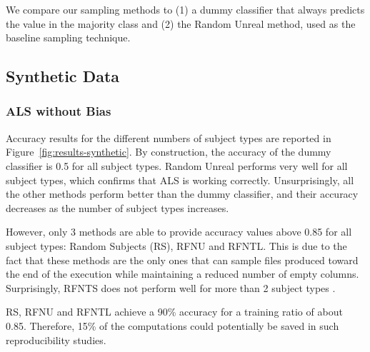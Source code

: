 \documentclass[10pt, conference, compsocconf]{IEEEtran}
\newcommand{\todo}[1]{\marginpar{\parbox{18mm}{\flushleft\tiny\color{red}\textbf{TODO}:
      #1}}}
\begin{document}
We compare our sampling methods to (1) a dummy classifier that always predicts the value in the majority class
 and (2) the Random Unreal method, used as the baseline sampling technique.

\subsection{Synthetic Data}

\subsubsection{ALS without Bias}

Accuracy results for the different numbers of subject types are 
reported in Figure~\ref{fig:results-synthetic}. By construction, the 
accuracy of the dummy classifier is 0.5 for all subject types. Random 
Unreal performs very well for all subject types, which confirms that 
ALS is working correctly. Unsurprisingly, all the other methods perform 
better than the dummy classifier, and their accuracy decreases as the 
number of subject types increases.

However, only 3 methods are able to provide accuracy values above 0.85 
for all subject types: Random Subjects (RS), RFNU and RFNTL. This is 
due to the fact that these methods are the only ones that can sample 
files produced toward the end of the execution while maintaining a 
reduced number of empty columns. Surprisingly, RFNTS does not perform 
well for more than 2 subject types \todo{Check that.}.

RS, RFNU and RFNTL achieve a 90\% accuracy for a training ratio of 
about 0.85. Therefore, 15\% of the computations could potentially be 
saved in such reproducibility studies.
\end{document}
